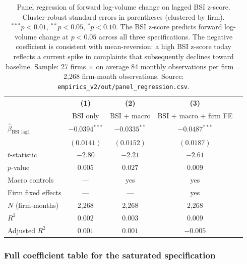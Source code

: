 \documentclass[11pt,a4paper]{article}
\begin{document}
\begin{table}[h]
\centering\small
\begin{tabular}{@{}lcccc@{}}
\toprule
 & \textbf{(1)} & \textbf{(2)} & \textbf{(3)} \\
 & BSI only & BSI + macro & BSI + macro + firm FE \\
\midrule
$\hat{\beta}_{\text{BSI lag1}}$  & $-0.0394^{***}$ & $-0.0335^{**}$  & $-0.0487^{***}$ \\
                                & $(0.0141)$       & $(0.0152)$       & $(0.0187)$       \\
$t$-statistic                    & $-2.80$          & $-2.21$          & $-2.61$          \\
$p$-value                        & $0.005$          & $0.027$          & $0.009$          \\
\midrule
Macro controls                   & ---              & yes              & yes              \\
Firm fixed effects               & ---              & ---              & yes              \\
$N$ (firm-months)                & 2{,}268          & 2{,}268          & 2{,}268          \\
$R^2$                            & $0.002$          & $0.003$          & $0.009$          \\
Adjusted $R^2$                   & $0.001$          & $0.001$          & $-0.005$         \\
\bottomrule
\end{tabular}
\caption{Panel regression of forward log-volume change on lagged BSI z-score. Cluster-robust standard errors in parentheses (clustered by firm). $^{***} p<0.01$, $^{**} p<0.05$, $^{*} p<0.10$. The BSI z-score predicts forward log-volume change at $p<0.05$ across all three specifications. The negative coefficient is consistent with mean-reversion: a high BSI z-score today reflects a current spike in complaints that subsequently declines toward baseline. Sample: 27 firms $\times$ on average 84 monthly observations per firm = 2{,}268 firm-month observations. Source: \texttt{empirics\_v2/out/panel\_regression.csv}.}\label{tab:panel}
\end{table}

\subsubsection{Full coefficient table for the saturated specification}\label{sec:panel_full}
\end{document}

